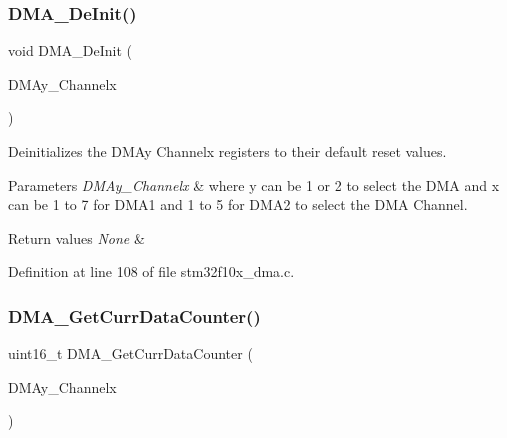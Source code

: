 \subsubsection{\texorpdfstring{D\+M\+A\+\_\+\+De\+Init()}{DMA\_DeInit()}}
{\footnotesize\ttfamily void D\+M\+A\+\_\+\+De\+Init (\begin{DoxyParamCaption}\item[{\hyperlink{struct_d_m_a___channel___type_def}{D\+M\+A\+\_\+\+Channel\+\_\+\+Type\+Def} $\ast$}]{D\+M\+Ay\+\_\+\+Channelx }\end{DoxyParamCaption})}



Deinitializes the D\+M\+Ay Channelx registers to their default reset values. 


\begin{DoxyParams}{Parameters}
{\em D\+M\+Ay\+\_\+\+Channelx} & where y can be 1 or 2 to select the D\+MA and x can be 1 to 7 for D\+M\+A1 and 1 to 5 for D\+M\+A2 to select the D\+MA Channel. \\
\hline
\end{DoxyParams}

\begin{DoxyRetVals}{Return values}
{\em None} & \\
\hline
\end{DoxyRetVals}


Definition at line 108 of file stm32f10x\+\_\+dma.\+c.

\mbox{\label{group___d_m_a___private___functions_ga511b4c402d1ff32d53f28736956cac5d}} 
\subsubsection{\texorpdfstring{D\+M\+A\+\_\+\+Get\+Curr\+Data\+Counter()}{DMA\_GetCurrDataCounter()}}
{\footnotesize\ttfamily uint16\+\_\+t D\+M\+A\+\_\+\+Get\+Curr\+Data\+Counter (\begin{DoxyParamCaption}\item[{\hyperlink{struct_d_m_a___channel___type_def}{D\+M\+A\+\_\+\+Channel\+\_\+\+Type\+Def} $\ast$}]{D\+M\+Ay\+\_\+\+Channelx }\end{DoxyParamCaption})}



